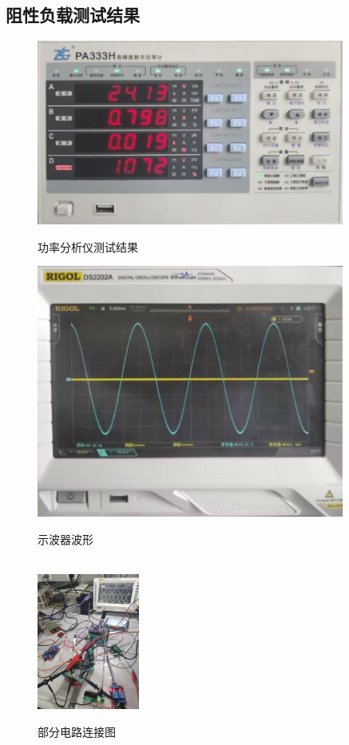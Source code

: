 \documentclass[a4paper,12pt]{article}
\begin{document}
\subsection{阻性负载测试结果}\label{res}
\begin{figure}[htbp]
    \centering
    \begin{minipage}{0.45\textwidth}
        \centering
        \includegraphics[width=0.9\textwidth]{src/result1.jpg}
        \caption{功率分析仪测试结果}
    \end{minipage}
    \qquad
    \begin{minipage}{0.45\textwidth}
        \centering
        \includegraphics[width=0.9\textwidth]{src/result2.jpg}
        \caption{示波器波形}
    \end{minipage}
    \\
    \includegraphics[width=0.3\textwidth]{src/circuit.jpg}
    \caption{部分电路连接图}
\end{figure}
\newpage
\end{document}
